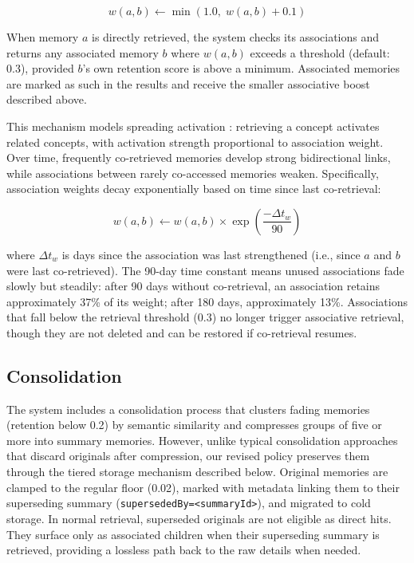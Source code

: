 \documentclass[11pt,a4paper]{article}
\begin{document}
\begin{equation}
w(a, b) \leftarrow \min(1.0,\; w(a, b) + 0.1)
\end{equation}

When memory $a$ is directly retrieved, the system checks its associations and returns any associated memory $b$ where $w(a, b)$ exceeds a threshold (default: 0.3), provided $b$'s own retention score is above a minimum. Associated memories are marked as such in the results and receive the smaller associative boost described above.

This mechanism models spreading activation \citep{collins1975spreading}: retrieving a concept activates related concepts, with activation strength proportional to association weight. Over time, frequently co-retrieved memories develop strong bidirectional links, while associations between rarely co-accessed memories weaken. Specifically, association weights decay exponentially based on time since last co-retrieval:

\begin{equation}
w(a, b) \leftarrow w(a, b) \times \exp\!\left(\frac{-\Delta t_w}{90}\right)
\end{equation}

\noindent where $\Delta t_w$ is days since the association was last strengthened (i.e., since $a$ and $b$ were last co-retrieved). The 90-day time constant means unused associations fade slowly but steadily: after 90 days without co-retrieval, an association retains approximately 37\% of its weight; after 180 days, approximately 13\%. Associations that fall below the retrieval threshold (0.3) no longer trigger associative retrieval, though they are not deleted and can be restored if co-retrieval resumes.

\subsection{Consolidation}
\label{sec:consolidation}

The system includes a consolidation process that clusters fading memories (retention below 0.2) by semantic similarity and compresses groups of five or more into summary memories. However, unlike typical consolidation approaches that discard originals after compression, our revised policy preserves them through the tiered storage mechanism described below. Original memories are clamped to the regular floor (0.02), marked with metadata linking them to their superseding summary (\texttt{supersededBy=<summaryId>}), and migrated to cold storage. In normal retrieval, superseded originals are not eligible as direct hits. They surface only as associated children when their superseding summary is retrieved, providing a lossless path back to the raw details when needed.
\end{document}
